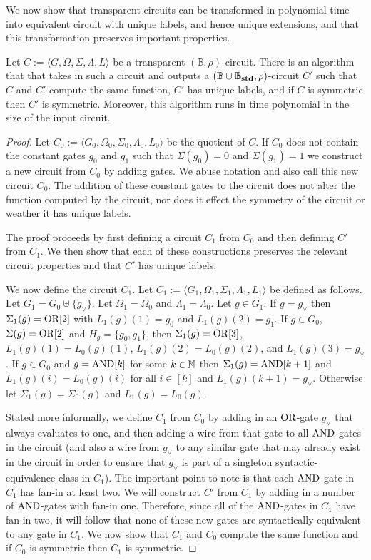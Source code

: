 \documentclass[../paper.tex]{subfiles}
\begin{document}
We now show that transparent circuits can be transformed in polynomial time into
equivalent circuit with unique labels, and hence unique extensions, and that
this transformation preserves important properties.

\begin{lem}
  Let $C := \langle G, \Omega, \Sigma, \Lambda, L \rangle$ be a transparent
  $(\mathbb{B}, \rho)$-circuit. There is an algorithm that that takes in such a
  circuit and outputs a $(\mathbb{B} \cup \mathbb{B}_{\text{\textbf{std}}}, \rho)$-circuit $C'$
  such that $C$ and $C'$ compute the same function, $C'$ has unique labels, and
  if $C$ is symmetric then $C'$ is symmetric. Moreover, this algorithm runs in
  time polynomial in the size of the input circuit.
  \label{lem:transparent-unique}
\end{lem}
\begin{proof}
  Let $C_0 := \langle G_0, \Omega_0, \Sigma_0, \Lambda_0, L_0 \rangle$ be the
  quotient of $C$. If $C_0$ does not contain the constant gates $g_0$ and $g_1$
  such that $\Sigma(g_0) = 0$ and $\Sigma (g_1) = 1$ we construct a new circuit
  from $C_0$ by adding gates. We abuse notation and also call this new circuit
  $C_0$. The addition of these constant gates to the circuit does not alter the
  function computed by the circuit, nor does it effect the symmetry of the
  circuit or weather it has unique labels.

  The proof proceeds by first defining a circuit $C_1$ from $C_0$ and then
  defining $C'$ from $C_1$. We then show that each of these constructions
  preserves the relevant circuit properties and that $C'$ has unique labels.

  We now define the circuit $C_1$. Let $C_1 := \langle G_1, \Omega_1, \Sigma_1 ,
  \Lambda_1, L_1 \rangle$ be defined as follows. Let $G_1 = G_0 \uplus \{
  g_\lor\}$. Let $\Omega_1 = \Omega_0$ and $\Lambda_1 = \Lambda_0$. Let $g \in
  G_1$. If $g = g_\lor$ then $\Sigma_1 (g) = \text{\upshape OR}[2]$ with $L_1(g)(1) = g_0$ and
  $L_1(g)(2) = g_1$. If $g \in G_0$, $\Sigma(g) = \text{\upshape OR}[2]$ and $H_g = \{g_0,
  g_1\}$, then $\Sigma_1 (g) = \text{\upshape OR}[3]$, $L_1(g)(1) = L_0(g)(1)$, $L_1(g)(2) =
  L_0(g)(2)$, and $L_1(g)(3) = g_\lor$. If $g \in G_0$ and $g = \text{\upshape AND}[k]$ for
  some $k \in \mathbb{N}$ then $\Sigma_1(g) = \text{\upshape AND}[k+1]$ and $L_1(g)(i) = L_0(g)(i)$
  for all $i \in [k]$ and $L_1(g)(k+1) = g_\lor$. Otherwise let $\Sigma_1(g) =
  \Sigma_0(g)$ and $L_1(g) = L_0(g)$.

  Stated more informally, we define $C_1$ from $C_0$ by adding in an $\text{\upshape OR}$-gate
  $g_\lor$ that always evaluates to one, and then adding a wire from that gate
  to all $\text{\upshape AND}$-gates in the circuit (and also a wire from $g_\lor$ to any
  similar gate that may already exist in the circuit in order to ensure that
  $g_\lor$ is part of a singleton syntactic-equivalence class in $C_1$). The
  important point to note is that each $\text{\upshape AND}$-gate in $C_1$ has fan-in at least
  two. We will construct $C'$ from $C_1$ by adding in a number of $\text{\upshape AND}$-gates
  with fan-in one. Therefore, since all of the $\text{\upshape AND}$-gates in $C_1$ have fan-in
  two, it will follow that none of these new gates are syntactically-equivalent
  to any gate in $C_1$. We now show that $C_1$ and $C_0$ compute the same
  function and if $C_0$ is symmetric then $C_1$ is symmetric.
  

\end{proof}
\end{document}
